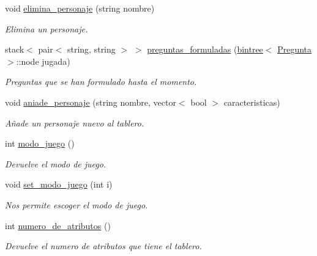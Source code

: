 \begin{DoxyCompactItemize}
void \hyperlink{classQuienEsQuien_ada5ff48eb2a12ddd07f11a01d2324982}{elimina\+\_\+personaje} (string nombre)
\begin{DoxyCompactList}\small\item\em Elimina un personaje. \end{DoxyCompactList}\item 
stack$<$ pair$<$ string, string $>$ $>$ \hyperlink{classQuienEsQuien_a932e5cd476ff4200b33f3f3a7f1fbac4}{preguntas\+\_\+formuladas} (\hyperlink{classbintree}{bintree}$<$ \hyperlink{classPregunta}{Pregunta} $>$\+::node jugada)
\begin{DoxyCompactList}\small\item\em Preguntas que se han formulado hasta el momento. \end{DoxyCompactList}\item 
void \hyperlink{classQuienEsQuien_ab2ded22e1d06ccb7c608ea1d7e3061d7}{aniade\+\_\+personaje} (string nombre, vector$<$ bool $>$ caracteristicas)
\begin{DoxyCompactList}\small\item\em Añade un personaje nuevo al tablero. \end{DoxyCompactList}\item 
int \hyperlink{classQuienEsQuien_a4ef0774b8d65ec46a1f164366a53b639}{modo\+\_\+juego} ()
\begin{DoxyCompactList}\small\item\em Devuelve el modo de juego. \end{DoxyCompactList}\item 
void \hyperlink{classQuienEsQuien_a63fc188524961569549bf5d178d589db}{set\+\_\+modo\+\_\+juego} (int i)
\begin{DoxyCompactList}\small\item\em Nos permite escoger el modo de juego. \end{DoxyCompactList}\item 
int \hyperlink{classQuienEsQuien_a5a17fe1e7c8fce05fc59c7cc89fe9ad3}{numero\+\_\+de\+\_\+atributos} ()
\begin{DoxyCompactList}\small\item\em Devuelve el numero de atributos que tiene el tablero. \end{DoxyCompactList}\end{DoxyCompactItemize}
